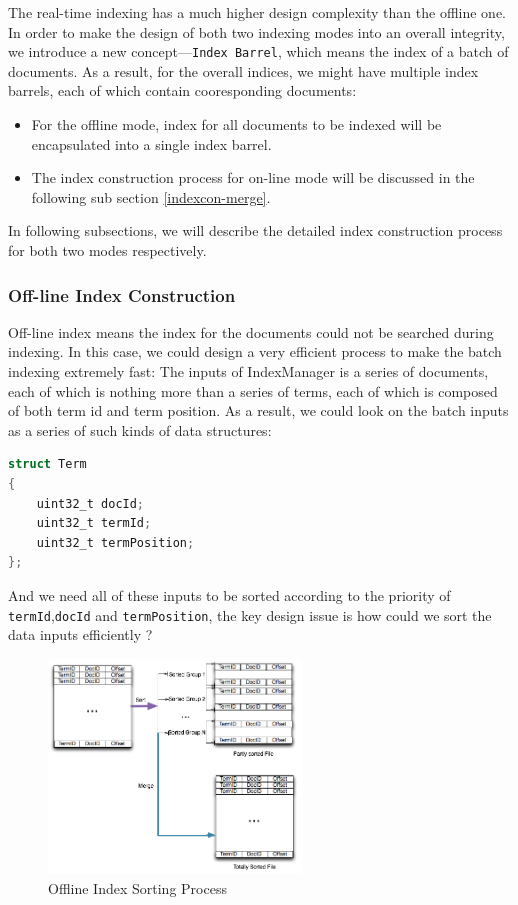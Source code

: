 The real-time indexing has a much higher design complexity than the offline one. In order to make the design of both two indexing modes into an overall integrity, we introduce a new concept---\texttt{Index Barrel},
which means the index of a batch of documents. As a result, for the overall indices, we might have multiple index barrels, each of which contain cooresponding documents:
\begin{itemize}
 \item For the offline mode, index for all documents to be indexed will be encapsulated into a single index barrel.
 \item The index construction process for on-line mode will be discussed in the following sub section \ref{indexcon-merge}.
\end{itemize}

In following subsections, we will describe the detailed index construction process for both two modes respectively.

\subsubsection{Off-line Index Construction} \label{indexcon-offline}
Off-line index means the index for the documents could not be searched during indexing. In this case, we could design a very efficient process to make the batch indexing extremely fast:
The inputs of IndexManager is a series of documents, each of which is nothing more than a series of terms, each of which is composed of both term id and term position. As a result, we could look on the 
batch inputs as a series of such kinds of data structures:
\begin{lstlisting}[language=C]
struct Term
{
    uint32_t docId;
    uint32_t termId;
    uint32_t termPosition;
};
\end{lstlisting}
And we need all of these inputs to be sorted according to the priority of \texttt{termId},\texttt{docId} and \texttt{termPosition}, the key design issue is how could we sort the data inputs efficiently ?

\begin{figure}[h!]
\centerline{\includegraphics[width=0.6\textwidth]{Figures/izene_sort.png}}
\caption{Offline Index Sorting Process}\label{fig:indexcon-sort}
\end{figure}


